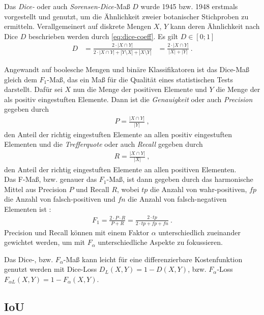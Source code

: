 Das \textit{Dice-} oder auch \textit{Sorensen-Dice-}Maß $D$ wurde 1945 bzw. 1948 erstmals vorgestellt und genutzt, um die Ähnlichkeit zweier botanischer Stichproben zu ermitteln. Verallgemeinert auf diskrete Mengen $X$, $Y$ kann deren Ähnlichkeit nach Dice $D$ beschrieben werden durch \autoref{eq:dice-coeff}. Es gilt $D \in [0; 1]$ \cite{Dice.1945} 
\begin{align}
	\label{eq:dice-coeff} D &= \frac{2 \cdot | X \cap Y |}{2 \cdot | X \cap Y | + |Y \setminus X| + |X \setminus Y|} 
	&=\frac{2 \cdot | X \cap Y |}{|X| + |Y|} ~.
\end{align} 

Angewandt auf boolesche Mengen und binäre Klassifikatoren ist das Dice-Maß gleich dem $F_1$-Maß, das ein Maß für die Qualität eines statistischen Tests darstellt. Dafür sei $X$ nun die Menge der positiven Elemente und $Y$ die Menge der als positiv eingestuften Elemente. Dann ist die \textit{Genauigkeit} oder auch \textit{Precision} gegeben durch
\begin{align}
	\label{eq:precision} P = \frac{|X \cap Y|}{|Y|}~,
\end{align}
den Anteil der richtig eingestuften Elemente an allen positiv eingestuften Elementen und die \textit{Trefferquote} oder auch \textit{Recall} gegeben durch
\begin{align}
	\label{eq:recall} R = \frac{|X \cap Y|}{|X|}~,
\end{align}
den Anteil der richtig eingestuften Elemente an allen positiven Elementen. \\
Das F-Maß, bzw. genauer das $F_1$-Maß, ist dann gegeben durch das harmonische Mittel aus Precision $P$ und Recall $R$, wobei $tp$ die Anzahl von wahr-positiven, $fp$ die Anzahl von falsch-positiven und $fn$ die Anzahl von falsch-negativen Elementen ist \cite{YutakaSasaki.2007}:
\begin{align}
	\label{eq:f1} F_{1} = \frac{2\cdot P\cdot R}{P + R} = \frac{2\cdot tp}{2 \cdot tp + fp + fn}~.
\end{align}
Precision und Recall können mit einem Faktor $\alpha$ unterschiedlich zueinander gewichtet werden, um mit $F_{\alpha}$ unterschiedliche Aspekte zu fokussieren. 

Das Dice-, bzw. $F_{\alpha}$-Maß kann leicht für eine differenzierbare Kostenfunktion genutzt werden mit Dice-Loss $D_{L}(X, Y) = 1 - D(X,Y)$, bzw. $F_{\alpha}$-Loss $F_{\alpha L}(X,Y) = 1 - F_{\alpha}(X,Y)$. 


\subsection{\acf{IoU}}

